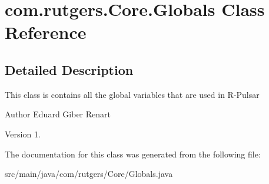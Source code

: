 \hypertarget{classcom_1_1rutgers_1_1Core_1_1Globals}{}\section{com.\+rutgers.\+Core.\+Globals Class Reference}
\label{classcom_1_1rutgers_1_1Core_1_1Globals}


\subsection{Detailed Description}
This class is contains all the global variables that are used in R-\/\+Pulsar

\begin{DoxyAuthor}{Author}
Eduard Giber Renart 
\end{DoxyAuthor}
\begin{DoxyVersion}{Version}
1. 
\end{DoxyVersion}


The documentation for this class was generated from the following file\+:\begin{DoxyCompactItemize}
\item 
src/main/java/com/rutgers/\+Core/Globals.\+java\end{DoxyCompactItemize}
